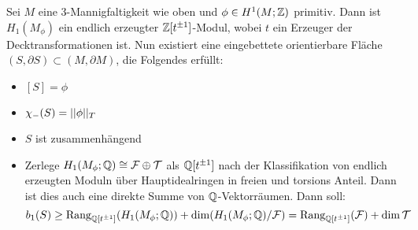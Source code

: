     \begin{prop}
        Sei $M$ eine 3-Mannigfaltigkeit wie oben und $\phi \in H^1(M;\mathbb{Z})$ primitiv. Dann ist $H_1(M_\phi)$ ein endlich erzeugter $\mathbb{Z}[t^{\pm 1}]$-Modul, wobei $t$ ein Erzeuger der Decktransformationen ist. Nun existiert eine eingebettete orientierbare Fläche $(S,\partial S) \subset (M,\partial M)$, die Folgendes erfüllt:
        \begin{itemize}
            \item $[S]=\phi$
            \item $\chi_-(S) = ||\phi||_T$
            \item $S$ ist zusammenhängend
            \item Zerlege $H_1(M_\phi;\mathbb{Q})\cong \mathcal{F} \oplus \mathcal{T}$ als $\mathbb{Q}[t^{\pm 1}]$ nach der Klassifikation von endlich erzeugten Moduln über Hauptidealringen in freien und torsions Anteil. Dann ist dies auch eine direkte Summe von $\mathbb{Q}$-Vektorräumen. Dann soll:
            \[
                b_1(S) \geq  \operatorname{Rang}_{\mathbb{Q}[t^{\pm 1}]}(H_1(M_\phi;\mathbb{Q})) + \dim(H_1(M_\phi;\mathbb{Q})/\mathcal F) = \operatorname{Rang}_{\mathbb{Q}[t^{\pm 1}]} (\mathcal F) + \dim \mathcal T
            \]
        \end{itemize}
    \end{prop}
